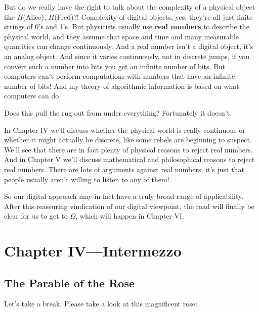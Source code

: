 \documentclass[12pt]{book}
\begin{document}
But do we really have the right to talk about the complexity of a physical object
like $H$(Alice), $H$(Fred)?!
Complexity of digital objects, yes, they're all just finite strings of 0's and 1's.
But physicists usually use \textbf{real numbers} to describe the physical world, 
and they assume that space and time and many measurable quantities can change continuously.
And a real number isn't a digital object, it's an analog object.
And since it varies continuously, not in discrete jumps, if you convert such a number
into bits you get an
infinite number of bits.
But computers can't perform computations with numbers that have an infinite number of bits!
And my theory of algorithmic information is based on what computers can do.
 
Does this pull the rug out from under everything? Fortunately it doesn't.
 
In Chapter IV we'll discuss whether the physical world is really continuous or whether
it might actually be discrete, like some rebels are beginning to suspect.
We'll see that there are in fact plenty of physical reasons to reject real numbers. 
And in 
Chapter V we'll discuss mathematical and philosophical reasons to reject real
numbers.
There are lots of arguments against real numbers, 
it's just that people usually aren't willing to listen to any of them!
 
So our digital approach may in fact have a truly broad range of applicability.
After this reassuring vindication of our digital viewpoint, the road will finally be clear
for us to get to $\Omega$, which will happen in Chapter VI.

\chapter*{Chapter IV---Intermezzo}

\section*{The Parable of the Rose}

Let's take a break.  Please take a look at this magnificent rose:
\vspace{7cm}
 
\end{document}
